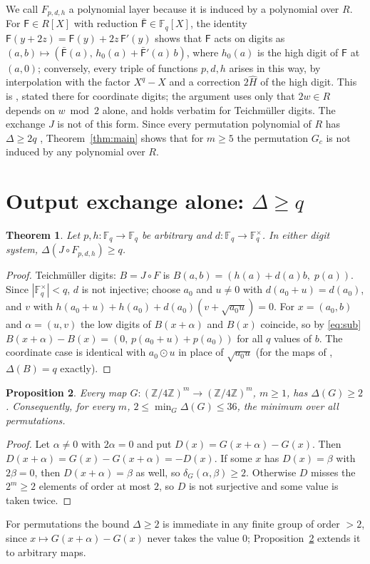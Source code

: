 \documentclass[11pt]{amsart}
\newtheorem{theorem}{Theorem}[section]
\newtheorem{proposition}[theorem]{Proposition}
\theoremstyle{definition}
\newcommand{\Fq}{\mathbb{F}_q}
\newcommand{\diff}{\delta}
\begin{document}
We call $F_{p,d,h}$ a polynomial layer because it is induced by a polynomial over $R$. For $\mathsf F\in R[X]$ with reduction
$\bar{\mathsf F}\in\Fq[X]$, the identity $\mathsf F(y+2z)=\mathsf F(y)+2z\,\mathsf F'(y)$ shows that $\mathsf F$ acts on digits as
$(a,b)\mapsto(\bar{\mathsf F}(a),\,h_0(a)+\bar{\mathsf F}'(a)\,b)$, where $h_0(a)$ is the high digit of $\mathsf F$ at $(a,0)$; conversely,
every triple of functions $p,d,h$ arises in this way, by interpolation with the factor $X^q-X$ and a correction $2\hat H$ of the high
digit. This is \cite[Proposition ``Coordinate form and realizability'']{FukuiDE}, stated there for coordinate digits; the argument
uses only that $2w\in R$ depends on $w\bmod 2$ alone, and holds verbatim for Teichm\"uller digits. The exchange $J$ is not of this form. Since every permutation polynomial of $R$ has $\Delta\ge2q$ \cite{RS}, Theorem~\ref{thm:main}
shows that for $m\ge5$ the permutation $G_c$ is not induced by any polynomial over $R$.

\section{\texorpdfstring{Output exchange alone: $\Delta\ge q$}{Output exchange alone}}

\begin{theorem}\label{thm:oneswap}
Let $p,h:\Fq\to\Fq$ be arbitrary and $d:\Fq\to\Fq^\times$. In either digit system, $\Delta(J\circ F_{p,d,h})\ge q$.
\end{theorem}
\begin{proof}
Teichm\"uller digits: $B=J\circ F$ is $B(a,b)=(h(a)+d(a)b,\;p(a))$. Since $|\Fq^\times|<q$, $d$ is not injective; choose $a_0$ and
$u\ne0$ with $d(a_0+u)=d(a_0)$, and $v$ with $h(a_0+u)+h(a_0)+d(a_0)(v+\sqrt{a_0u})=0$. For $x=(a_0,b)$ and $\alpha=(u,v)$ the low
digits of $B(x+\alpha)$ and $B(x)$ coincide, so by \eqref{eq:sub}
$B(x+\alpha)-B(x)=(0,\,p(a_0+u)+p(a_0))$ for all $q$ values of $b$. The coordinate case is identical with $a_0\odot u$ in place of
$\sqrt{a_0u}$ (for the maps of \cite{FukuiDE}, $\Delta(B)=q$ exactly).
\end{proof}

\begin{proposition}\label{prop:two}
Every map $G:(\mathbb Z/4\mathbb Z)^m\to(\mathbb Z/4\mathbb Z)^m$, $m\ge1$, has $\Delta(G)\ge2$. Consequently, for every $m$,
$2\le\min_G\Delta(G)\le36$, the minimum over all permutations.
\end{proposition}
\begin{proof}
Let $\alpha\ne0$ with $2\alpha=0$ and put $D(x)=G(x+\alpha)-G(x)$. Then $D(x+\alpha)=G(x)-G(x+\alpha)=-D(x)$. If some $x$ has
$D(x)=\beta$ with $2\beta=0$, then $D(x+\alpha)=\beta$ as well, so $\diff_G(\alpha,\beta)\ge2$. Otherwise $D$ misses the $2^m\ge2$
elements of order at most $2$, so $D$ is not surjective and some value is taken twice.
\end{proof}
For permutations the bound $\Delta\ge2$ is immediate in any finite group of order $>2$, since $x\mapsto G(x+\alpha)-G(x)$ never takes the
value $0$; Proposition~\ref{prop:two} extends it to arbitrary maps.
\end{document}
